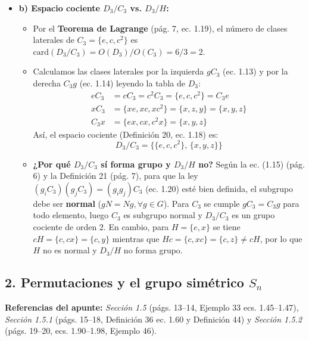 \documentclass[11pt, a4paper]{article}
\begin{document}
\begin{itemize}
    \item \textbf{b) Espacio cociente $D_3/C_3$ vs. $D_3/H$:}
    \begin{itemize}
        \item Por el \textbf{Teorema de Lagrange} (pág. 7, ec. 1.19), el número de clases laterales de $C_3 = \{e, c, c^2\}$ es $\text{card}(D_3/C_3) = O(D_3)/O(C_3) = 6/3 = 2$.
        \item Calculamos las clases laterales por la izquierda $gC_3$ (ec. 1.13) y por la derecha $C_3g$ (ec. 1.14) leyendo la tabla de $D_3$:
        \begin{align*}
            eC_3 &= cC_3 = c^2C_3 = \{e, c, c^2\} = C_3e \\
            xC_3 &= \{xe, xc, xc^2\} = \{x, z, y\} = \{x, y, z\} \\
            C_3x &= \{ex, cx, c^2x\} = \{x, y, z\}
        \end{align*}
        Así, el espacio cociente (Definición 20, ec. 1.18) es:
        \[
        D_3/C_3 = \big\{ \{e, c, c^2\}, \, \{x, y, z\} \big\}
        \]
        \item \textbf{¿Por qué $D_3/C_3$ sí forma grupo y $D_3/H$ no?} Según la ec. (1.15) (pág. 6) y la Definición 21 (pág. 7), para que la ley $(g_i C_3)(g_j C_3) = (g_i g_j)C_3$ (ec. 1.20) esté bien definida, el subgrupo debe ser \textbf{normal} ($gN = Ng, \forall g \in G$). Para $C_3$ se cumple $gC_3 = C_3g$ para todo elemento, luego $C_3$ es subgrupo normal y $D_3/C_3$ es un grupo cociente de orden $2$. En cambio, para $H = \{e, x\}$ se tiene $cH = \{c, cx\} = \{c, y\}$ mientras que $Hc = \{c, xc\} = \{c, z\} \neq cH$, por lo que $H$ no es normal y $D_3/H$ no forma grupo.
    \end{itemize}
\end{itemize}

\subsection*{2. Permutaciones y el grupo simétrico $S_n$}
\textbf{Referencias del apunte:} \textit{Sección 1.5} (págs. 13--14, Ejemplo 33 ecs. 1.45--1.47), \textit{Sección 1.5.1} (págs. 15--18, Definición 36 ec. 1.60 y Definición 44) y \textit{Sección 1.5.2} (págs. 19--20, ecs. 1.90--1.98, Ejemplo 46).
\end{document}
